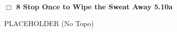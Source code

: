 \begin{multicols}{2}
\needspace{1.5cm}
\label{rt:Stop Once to Wipe the Sweat Away}
\colorbox{RoyalBlue!20}{
\parbox{0.95\linewidth}{
\hspace{-1ex}\textbf{$\Box$
8 Stop Once to Wipe the Sweat Away 5.10a  
}}}
\begin{adjustwidth}{1.3em}{}			
PLACEHOLDER
  (No Topo)
\end{adjustwidth}






\end{multicols}
\clearpage